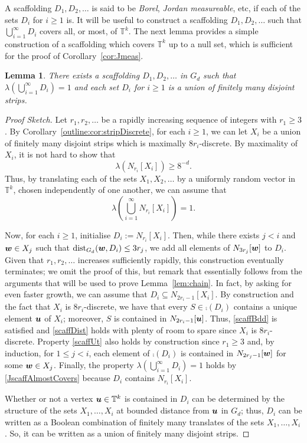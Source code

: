 \documentclass[12pt,a4paper]{amsart}
\numberwithin{equation}{section}
\newtheorem{lemma}[equation]{Lemma}
\theoremstyle{definition}
\begin{document}
A scaffolding $D_1,D_2,\dots$ is said to be \emph{Borel}, \emph{Jordan measureable}, etc, if each of the sets $D_i$ for $i\geq1$ is. It will be useful to construct a scaffolding $D_1,D_2,\dots$ such that $\bigcup_{i=1}^\infty D_i$ covers all, or most, of $\mathbb{T}^k$. The next lemma provides a simple construction of a scaffolding which covers $\mathbb{T}^k$ up to a null set, which is sufficient for the proof of Corollary~\ref{cor:Jmeas}. 


\begin{lemma}
\label{outline:lem:JordanScaff}
There exists a scaffolding $D_1,D_2,\dots$ in $G_d$ such that $\lambda\left(\bigcup_{i=1}^\infty D_i\right)=1$ and each set $D_i$ for $i\geq1$ is a union of finitely many disjoint strips. 
\end{lemma}

\begin{proof}[Proof Sketch]
Let $r_1,r_2,\dots$ be a rapidly increasing sequence of integers with $r_1\geq3$. By Corollary~\ref{outline:cor:stripDiscrete}, for each $i\geq1$, we can let $X_i$ be a union of finitely many disjoint strips which is maximally $8r_i$-discrete. By maximality of $X_i$, it is not hard to show that
\[\lambda\left(N_{r_i}[X_i]\right)\geq 8^{-d}.\]
Thus, by translating each of the sets $X_1,X_2,\dots$ by a uniformly random vector in $\mathbb{T}^k$, chosen independently of one another, we can assume that
\begin{equation}\label{JscaffAlmostCovers}\lambda\left(\bigcup_{i=1}^\infty N_{r_i}[X_i]\right)=1.\end{equation}

Now, for each $i\geq1$, initialise $D_i:=N_{r_i}[X_i]$. Then, while there exists $j<i$ and $\boldsymbol{w}\in X_j$ such that $\operatorname{dist}_{G_d}(\boldsymbol{w},D_i)\leq 3r_j$, we add all elements of $N_{3r_j}[\boldsymbol{w}]$ to $D_i$. Given that $r_1,r_2,\dots$ increases sufficiently rapidly, this construction eventually terminates; we omit the proof of this, but remark that essentially follows from the arguments that will be used to prove Lemma~\ref{lem:chain}. In fact, by asking for even faster growth, we can assume that $D_i\subseteq N_{2r_i-1}[X_i]$. By construction and the fact that $X_i$ is $8r_i$-discrete, we have that  every $S\in \comp(D_i)$ contains a unique element $\boldsymbol{u}$ of $X_i$; moreover, $S$ is contained in $N_{2r_i-1}[\boldsymbol{u}]$. Thus, \eqref{scaffBdd} is satisfied and \eqref{scaffDist} holds with plenty of room to spare since $X_i$ is $8r_i$-discrete. Property \eqref{scaffUt} also holds by construction since $r_1\geq3$ and, by induction, for $1\leq j<i$, each element of $\comp(D_i)$ is contained in $N_{2r_j-1}[\boldsymbol{w}]$ for some $\boldsymbol{w}\in X_j$. Finally, the property $\lambda\left(\bigcup_{i=1}^\infty D_i\right)=1$ holds by \eqref{JscaffAlmostCovers} because $D_i$ contains $N_{r_i}[X_i]$. 

Whether or not a vertex $\boldsymbol{u}\in\mathbb{T}^k$ is contained in $D_i$ can be determined by the structure of the sets $X_1,\dots,X_i$ at bounded distance from $\boldsymbol{u}$ in $G_d$; thus, $D_i$ can be written as a Boolean combination of finitely many translates of the sets $X_1,\dots,X_i$. So, it can be written as a union of finitely many disjoint strips. 
\end{proof}
\end{document}
